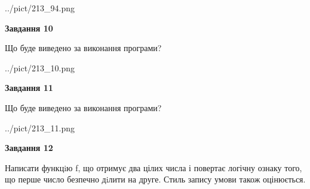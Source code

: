 \documentclass[12pt, ukrainian]{article}
\begin{document}
{\begin {large}
\begin{center}
	{../pict/213_94.png}
\end{center}
\newpage

{\begin {center}\textbf{Завдання 10}\end {center}}

Що буде виведено за виконання програми?\par
\begin{center}
	{../pict/213_10.png}
\end{center}
\newpage

{\begin {center}\textbf{Завдання 11}\end {center}}

Що буде виведено за виконання програми?\par
\begin{center}
	{../pict/213_11.png}
\end{center}
\newpage

{\begin {center}\textbf{Завдання 12}\end {center}}


Написати функцiю f, що отримує два цілих числа і повертає логічну ознаку того, що перше число безпечно дiлити на друге. Стиль запису умови також оцінюється.\par
\newpage

\end {large}}
\end{document}
